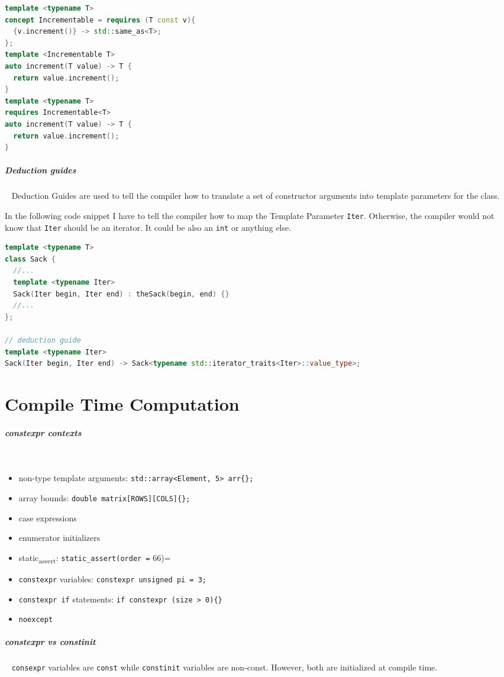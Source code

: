 \documentclass[11pt,twoside,landscape]{article}
\begin{document}
\begin{multicols}{2}
\begin{lstlisting}[language=c++,label=lst:compound-requirements-exmaple,caption={Compound requirements exmaple},captionpos=b,numbers=none]
template <typename T>
concept Incrementable = requires (T const v){
  {v.increment()} -> std::same_as<T>;
};
template <Incrementable T>
auto increment(T value) -> T {
  return value.increment();
}
template <typename T>
requires Incrementable<T>
auto increment(T value) -> T {
  return value.increment();
}
\end{lstlisting}

\subparagraph{Deduction guides} \
\label{sec:org7561fc2}
Deduction Guides are used to tell the compiler how to translate a set of constructor arguments into template parameters for the class.

In the following code snippet I have to tell the compiler how to map the Template Parameter \texttt{Iter}.
Otherwise, the compiler would not know that \texttt{Iter} should be an iterator.
It could be also an \texttt{int} or anything else.


\begin{lstlisting}[language=c++,numbers=none]
template <typename T>
class Sack {
  //...
  template <typename Iter>
  Sack(Iter begin, Iter end) : theSack(begin, end) {}
  //...
};

// deduction guide
template <typename Iter>
Sack(Iter begin, Iter end) -> Sack<typename std::iterator_traits<Iter>::value_type>;
\end{lstlisting}

\section{Compile Time Computation}
\label{sec:org184e135}
\subparagraph{constexpr contexts} \
\label{sec:orga42a225}
\begin{itemize}
\item non-type template arguments: \texttt{std::array<Element, 5> arr\{\};}
\item array bounds: \texttt{double matrix[ROWS][COLS]\{\};}
\item case expressions
\item enumerator initializers
\item static\textsubscript{assert}: \texttt{static\_assert(order =} 66)=
\item \texttt{constexpr} variables: \texttt{constexpr unsigned pi = 3;}
\item \texttt{constexpr if} statements: \texttt{if constexpr (size > 0)\{\}}
\item \texttt{noexcept}
\end{itemize}

\subparagraph{constexpr vs constinit} \
\label{sec:orgb770c52}
\texttt{consexpr} variables are \texttt{const} while \texttt{constinit} variables are non-const.
However, both are initialized at compile time.


\end{multicols}
\end{document}
